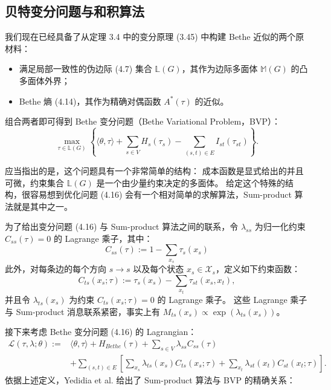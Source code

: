 \subsection{贝特变分问题与和积算法}

我们现在已经具备了从定理 3.4 中的变分原理 (3.45) 中构建 Bethe 近似的两个原材料：
\begin{itemize}
    \item 满足局部一致性的伪边际 (4.7) 集合 $\mathbb{L}(G)$，其作为边际多面体 $\mathbb{M}(G)$ 的凸多面体外界；
    \item Bethe 熵 (4.14)，其作为精确对偶函数 $A^*(\tau)$ 的近似。
\end{itemize}
组合两者即可得到 Bethe 变分问题（Bethe Variational Problem，BVP）：
\begin{equation}
    \max_{\tau \in \mathbb{L}(G)}\left\{\langle\theta, \tau\rangle + \sum_{s \in V}H_s(\tau_s) - \sum_{(s, t) \in E}I_{st}(\tau_{st})\right\}.
\end{equation}

应当指出的是，这个问题具有一个非常简单的结构：
成本函数是显式给出的并且可微，约束集合 $\mathbb{L}(G)$ 是一个由少量约束决定的多面体。
给定这个特殊的结构，很容易想到优化问题 (4.16) 会有一个相对简单的求解算法，Sum-product 算法就是其中之一。

为了给出变分问题 (4.16) 与 Sum-product 算法之间的联系，令 $\lambda_{ss}$ 为归一化约束 $C_{ss}(\tau) = 0$ 的 Lagrange 乘子，其中：
\begin{equation}
    C_{ss}(\tau) := 1 - \sum_{x_s}\tau_s(x_s)
\end{equation}
此外，对每条边的每个方向 $s \rightarrow s$ 以及每个状态 $x_s \in \mathcal{X}_s$，定义如下约束函数：
\begin{equation}
    C_{ts}(x_s; \tau) := \tau_s(x_s) - \sum_{x_t}\tau_{st}(x_s, x_t),
\end{equation}
并且令 $\lambda_{ts}(x_s)$ 为约束 $C_{ts}(x_s; \tau) = 0$ 的 Lagrange 乘子。
这些 Lagrange 乘子与 Sum-product 消息联系紧密，事实上有 $M_{ts}(x_s) \propto \exp(\lambda_{ts}(x_s))$。

接下来考虑 Bethe 变分问题 (4.16) 的 Lagrangian：
\begin{align}
    \mathcal{L}(\tau, \lambda; \theta) := &\langle\theta, \tau\rangle + H_{Bethe}(\tau) + \sum_{s \in V}\lambda_{ss}C_{ss}(\tau) \nonumber \\
    & + \sum_{(s, t) \in E}\left[\sum_{x_s}\lambda_{ts}(x_s)C_{ts}(x_s; \tau) + \sum_{x_t}\lambda_{st}(x_t)C_{st}(x_t; \tau)\right].
\end{align}
依据上述定义，Yedidia et al. 给出了 Sum-product 算法与 BVP 的精确关系：

